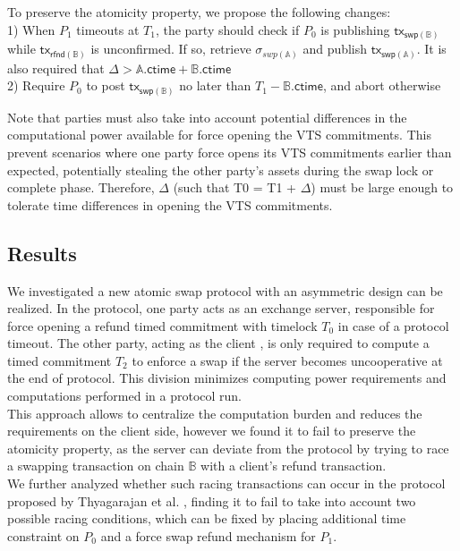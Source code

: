 \documentclass{article}      	%
\begin{document}
To preserve the atomicity property, we propose the following changes: \\
1) When $P_1$ timeouts at $T_1$, the party should check if $P_0$ is publishing $\mathsf{tx_{swp(\mathbb{B})}}$ while $\mathsf{tx_{rfnd(\mathbb{B})}}$ is unconfirmed. If so, retrieve $\sigma_{swp(\mathbb{A})}$ and publish $\mathsf{tx_{swp(\mathbb{A})}}$. It is also required that $\Delta > \mathbb{A}.\mathsf{ctime} + \mathbb{B}.\mathsf{ctime}$ \\
2) Require $P_0$ to post $\mathsf{tx_{swp(\mathbb{B})}}$ no later than $T_1 - \mathbb{B}.\mathsf{ctime}$, and abort otherwise 

Note that parties must also take into account potential differences in the computational power available for force opening the VTS commitments. This prevent scenarios where one party force opens its VTS commitments earlier than expected, potentially stealing 
 the other party's assets during the swap lock or complete phase. Therefore,  $\Delta$ (such that T0 = T1 + $\Delta$) must be large enough to tolerate time differences in opening the VTS commitments. \\

\subsection{Results}

We investigated a new atomic swap protocol with an asymmetric design can be realized. In the protocol, one party acts as an exchange server, responsible for force opening a refund timed commitment with timelock $T_0$ in case of a protocol timeout. The other party, acting as the client , is only required to compute a timed commitment $T_2$ to enforce a swap if the server becomes uncooperative at the end of protocol. This division minimizes computing power requirements and computations performed in a protocol run. \\
This approach allows to centralize the computation burden and reduces the requirements on the client side, however we found it to fail to preserve the atomicity property, as the server can deviate from the protocol by trying to race a swapping transaction on chain $\mathbb{B}$ with a client's refund transaction. \\
We further analyzed whether such racing transactions can occur in the protocol proposed by Thyagarajan et al. \cite{uas}, finding it to fail to take into account two possible racing conditions, which can be fixed by placing additional time constraint on $P_0$ and a force swap refund mechanism for $P_1$.
\end{document}
